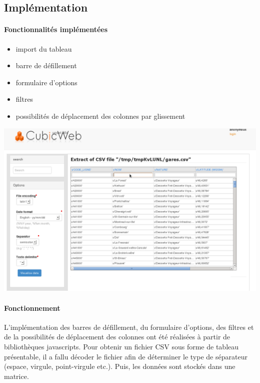 \documentclass {report}
\begin{document}
\subsection{Implémentation}

\paragraph{Fonctionnalités implémentées}
\begin{itemize}
\item import du tableau
\item barre de défillement
\item formulaire d'options
\item filtres
\item possibilités de déplacement des colonnes par glissement
\end{itemize}

\begin{center}
\includegraphics[scale=0.5]{slick.png}
\end{center}

\paragraph{Fonctionnement}
L'implémentation des barres de défillement, du formulaire d'options, des filtres et de la possibilités de déplacement des colonnes ont été réalisées à partir de bibliothèques javascripts. Pour obtenir un fichier CSV sous forme de tableau présentable, il a fallu décoder le fichier afin de déterminer le type de séparateur (espace, virgule, point-virgule etc.). Puis, les données sont stockés dans une matrice.
\end{document}
